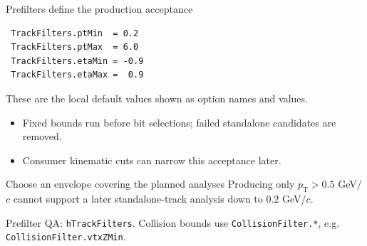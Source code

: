 \begin{frame}[fragile,shrink=8]{Prefilters define the production acceptance}
 \small
 \begin{lstlisting}
 TrackFilters.ptMin  = 0.2
 TrackFilters.ptMax  = 6.0
 TrackFilters.etaMin = -0.9
 TrackFilters.etaMax =  0.9
 \end{lstlisting}
 These are the local default values shown as option names and values.
 \begin{itemize}\setlength{\itemsep}{2pt}
 \item Fixed bounds run before bit selections; failed standalone candidates are removed.
 \item Consumer kinematic cuts can narrow this acceptance later.
 \end{itemize}
 \begin{block}{Choose an envelope covering the planned analyses}
 Producing only $p_{\mathrm T}>0.5$ GeV/$c$ cannot support a later standalone-track analysis down to $0.2$ GeV/$c$.
 \end{block}
 \small Prefilter QA: \texttt{hTrackFilters}. Collision bounds use \texttt{CollisionFilter.*}, e.g. \texttt{CollisionFilter.vtxZMin}.
\end{frame}

